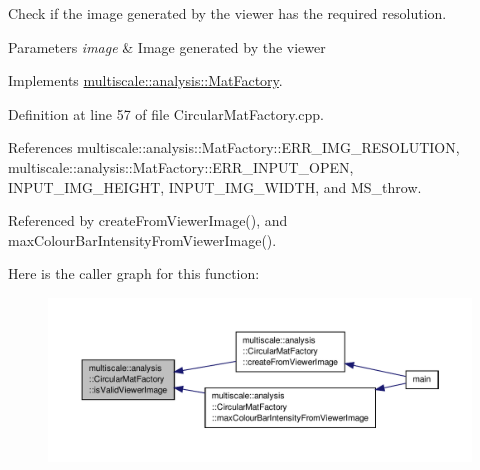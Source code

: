 Check if the image generated by the viewer has the required resolution. 


\begin{DoxyParams}{Parameters}
{\em image} & Image generated by the viewer \\
\hline
\end{DoxyParams}


Implements \hyperlink{classmultiscale_1_1analysis_1_1MatFactory_ad6acdd120b128eb9fb502fca23a7de69}{multiscale\-::analysis\-::\-Mat\-Factory}.



Definition at line 57 of file Circular\-Mat\-Factory.\-cpp.



References multiscale\-::analysis\-::\-Mat\-Factory\-::\-E\-R\-R\-\_\-\-I\-M\-G\-\_\-\-R\-E\-S\-O\-L\-U\-T\-I\-O\-N, multiscale\-::analysis\-::\-Mat\-Factory\-::\-E\-R\-R\-\_\-\-I\-N\-P\-U\-T\-\_\-\-O\-P\-E\-N, I\-N\-P\-U\-T\-\_\-\-I\-M\-G\-\_\-\-H\-E\-I\-G\-H\-T, I\-N\-P\-U\-T\-\_\-\-I\-M\-G\-\_\-\-W\-I\-D\-T\-H, and M\-S\-\_\-throw.



Referenced by create\-From\-Viewer\-Image(), and max\-Colour\-Bar\-Intensity\-From\-Viewer\-Image().



Here is the caller graph for this function\-:\nopagebreak
\begin{figure}[H]
\begin{center}
\leavevmode
\includegraphics[width=350pt]{classmultiscale_1_1analysis_1_1CircularMatFactory_a08e407b35a2d314c1aa17f21040ff23a_icgraph}
\end{center}
\end{figure}


